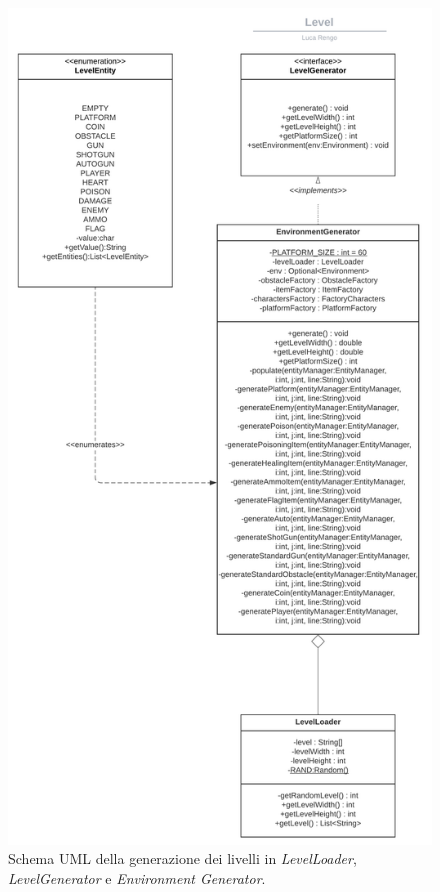 \begin{figure}[H]
	\centering{} 
	\includegraphics[width=.5\textwidth]{./img/level_uml.png} 
	\caption{Schema UML della generazione dei livelli in \emph{LevelLoader}, \emph{LevelGenerator} e \emph{Environment Generator}.}
	\label{img:level_uml}
\end{figure}

